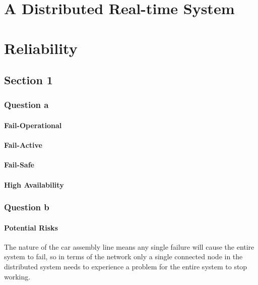 \documentclass[]{report}
\begin{document}
	\chapter{A Distributed Real-time System}
		
	
	
	\chapter{Reliability}
		\section{Section 1}
			\subsection{Question a}
				\subsubsection{Fail-Operational}
				\subsubsection{Fail-Active}
				\subsubsection{Fail-Safe}
				\subsubsection{High Availability}
				
				
				
			
			\subsection{Question b}
				\subsubsection{Potential Risks}
				The nature of the car assembly line means any single failure will cause the entire system to fail, so in terms of the network only a single connected node in the distributed system needs to experience a problem for the entire system to stop working. 
				
\end{document}
